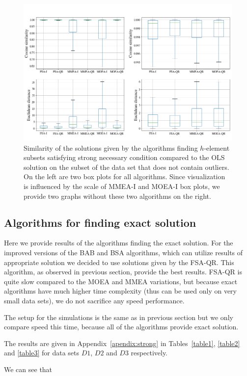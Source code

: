\begin{figure}[h]
    \centering
    \includegraphics[width=14cm]{img/all_distances_feasible}

    \caption{Similarity of the solutions given by the algorithms finding $h$-element subsets satisfying strong necessary condition compared to the OLS solution on the subset of the data set that does not contain outliers. On the left are two box plots for all algorithms. Since visualization is influenced by the scale of MMEA-I and MOEA-I box plots, we provide two graphs without these two algorithms on the right.}
    \label{all_distances}
\end{figure}

\subsection{Algorithms for finding exact solution}
Here we provide results of the algorithms finding the exact solution. For the improved versions of the BAB and BSA algorithms, which can utilize results of appropriate solution we decided to use solutions given by the FSA-QR. This algorithm, as observed in previous section, provide the best results. FSA-QR is quite slow compared to the MOEA and MMEA variations, but because exact algorithms have much higher time complexity (thus can be used only on very small data sets), we do not sacrifice any speed performance.

The setup for the simulations is the same as in previous section but we only compare speed this time, because all of the algorithms provide exact solution. 

The results are given in Appendix~\ref{apendix:strong} in Tables~\ref{table1}, \ref{table2} and \ref{table3} for data sets $D1$, $D2$ and $D3$ respectively. 
    
We can see that 
